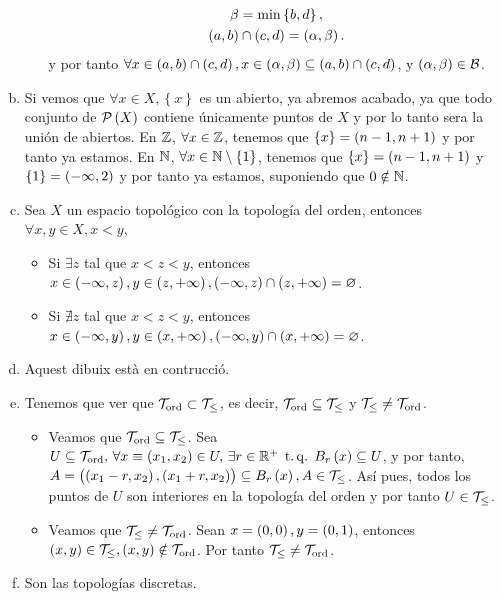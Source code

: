\begin{eje}
\begin{enumerate}[(a)]
\begin{enumerate}[i)]
\begin{gather*}
                        \beta = \min \left\{ b, d \right\}, \\
                        \left( a, b \right) \cap \left( c, d \right) = \left( \alpha, \beta \right).
                    \end{gather*}
                    y por tanto $\forall x \in \left( a, b \right) \cap \left( c, d \right), x \in \left( \alpha, \beta \right) \subseteq \left( a, b \right) \cap \left( c, d \right)$, y $\left( \alpha, \beta \right) \in \mathcal{B}$.
            \end{enumerate}
        \item Si vemos que $\forall x \in X, \left\{ x \right\}$ es un abierto, ya abremos acabado, ya que todo conjunto de $\mathcal{P} \left( X \right)$ contiene únicamente puntos de $X$ y por lo tanto sera la unión de abiertos. En $\mathbb{Z}$, $\forall x \in \mathbb{Z}$, tenemos que $\left\{ x \right\} = \left( n-1, n+1 \right)$ y por tanto ya estamos. En $\mathbb{N}$, $\forall x \in \mathbb{N} \setminus \left\{ 1 \right\}$, tenemos que $\left\{ x \right\} = \left( n-1, n+1 \right)$ y $\left\{ 1 \right\} = \left( -\infty, 2 \right)$ y por tanto ya estamos, suponiendo que $0 \notin \mathbb{N}$.
        \item Sea $X$ un espacio topológico con la topología del orden, entonces $\forall x, y \in X, x < y$,
            \begin{itemize}
                \item Si $\exists z$ tal que $x < z < y$, entonces $x \in \left( -\infty, z \right), y \in \left( z, +\infty \right), \left( -\infty, z \right) \cap \left( z, +\infty \right) = \varnothing$.
                \item Si $\nexists z$ tal que $x < z < y$, entonces $x \in \left( -\infty, y \right), y \in \left( x, +\infty \right), \left( -\infty, y \right) \cap \left( x, +\infty \right) = \varnothing$.
            \end{itemize}
        \item Aquest dibuix està en contrucció. %
        \item Tenemos que ver que $\mathcal{T}_{\text{ord}} \subset \mathcal{T}_\leq$, es decir, $\mathcal{T}_{\text{ord}} \subseteq \mathcal{T}_\leq$ y $\mathcal{T}_\leq \neq \mathcal{T}_{\text{ord}}$.
            \begin{itemize}
                \item Veamos que $\mathcal{T}_{\text{ord}} \subseteq \mathcal{T}_\leq$. Sea $U \subseteq \mathcal{T}_{\text{ord}},\, \forall x \equiv \left( x_1, x_2 \right) \in U, \, \exists r \in \mathbb{R}^+ \operatorname{\;t.q.\;} B_r \left( x \right) \subseteq U$, y por tanto, $A = \left( \left( x_1 - r, x_2 \right), \left( x_1 + r, x_2 \right) \right) \subseteq B_r \left( x \right), A \in \mathcal{T}_\leq$. Así pues, todos los puntos de $U$ son interiores en la topología del orden y por tanto $U \in \mathcal{T}_\leq$.
                \item Veamos que $\mathcal{T}_\leq \neq \mathcal{T}_{\text{ord}}$. Sean $x = \left( 0,0 \right), y = \left( 0, 1 \right)$, entonces $\left( x, y \right) \in \mathcal{T}_\leq, \left( x, y \right) \notin \mathcal{T}_{\text{ord}}$. Por tanto $\mathcal{T}_\leq \neq \mathcal{T}_{\text{ord}}$.
            \end{itemize}
        \item Son las topologías discretas.
    \end{enumerate}
\end{eje}
